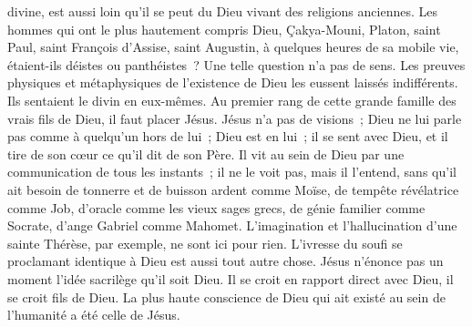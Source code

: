 \documentclass[french,twoside]{book} %
\begin{document}
divine, est aussi loin qu’il se peut du Dieu vivant des religions anciennes. Les hommes qui ont le plus hautement compris Dieu, Çakya-Mouni, Platon, saint Paul, saint François d’Assise, saint Augustin, à quelques heures de sa mobile vie, étaient-ils déistes ou panthéistes ? Une telle question n’a pas de sens. Les preuves physiques et métaphysiques de l’existence de Dieu les eussent laissés indifférents. Ils sentaient le divin en eux-mêmes. Au premier rang de cette grande famille des vrais fils de Dieu, il faut placer Jésus. Jésus n’a pas de visions ; Dieu ne lui parle pas comme à quelqu’un hors de lui ; Dieu est en lui ; il se sent avec Dieu, et il tire de son cœur ce qu’il dit de son Père. Il vit au sein de Dieu par une communication de tous les instants ; il ne le voit pas, mais il l’entend, sans qu’il ait besoin de tonnerre et de buisson ardent comme Moïse, de tempête révélatrice comme Job, d’oracle comme les vieux sages grecs, de génie familier comme Socrate, d’ange Gabriel comme Mahomet. L’imagination et l’hallucination d’une sainte Thérèse, par exemple, ne sont ici pour rien. L’ivresse du soufi se proclamant identique à Dieu est aussi tout autre chose. Jésus n’énonce pas un moment l’idée sacrilège qu’il soit Dieu. Il se croit en rapport direct avec Dieu, il se croit fils de Dieu. La plus haute conscience de Dieu qui ait existé au sein de l’humanité a été celle de Jésus.\par
\end{document}
